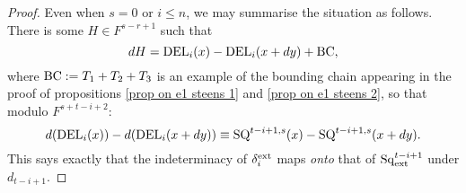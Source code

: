 \documentclass[11pt]{amsart} \renewcommand{\baselinestretch}{1.2}
\theoremstyle{plain}
\newtheorem{cor}[thm]{Corollary}
\theoremstyle{definition}
\newcommand{\Sq}{\mathrm{Sq}}
\newcommand{\E}[5]{[E^{#1}_{#2}#3]^{#4}_{#5}}
\begin{document}
\begin{second quadrant homotopy sseq operations}
\begin{proof}
Even when $s=0$ or $i\leq n$, we may summarise the situation as follows. There is some $H\in F^{s-r+1}$ such that
\[
dH
=
\textup{DEL}_i(x)-\textup{DEL}_i(x+dy)+\textup{BC},%
\]
where $\textup{BC}:=T_1+T_2+T_3$ is an example of the bounding chain appearing in the proof of propositions \ref{prop on e1 steens 1} and \ref{prop on e1 steens 2}, so that
modulo $F^{s+t-i+2}$:
\[d(\textup{DEL}_i(x))-d(\textup{DEL}_i(x+dy))
\equiv
\textup{SQ}^{t-i+1,s}(x)-\textup{SQ}^{t-i+1,s}(x+dy).\]
%
This says exactly that the indeterminacy of $\delta_i^\textup{ext}$ maps \emph{onto} that of $\Sq_\textup{ext}^{t-i+1}$ under $d_{t-i+1}$.
\end{proof}
%
%


\end{second quadrant homotopy sseq operations}
\end{document}
